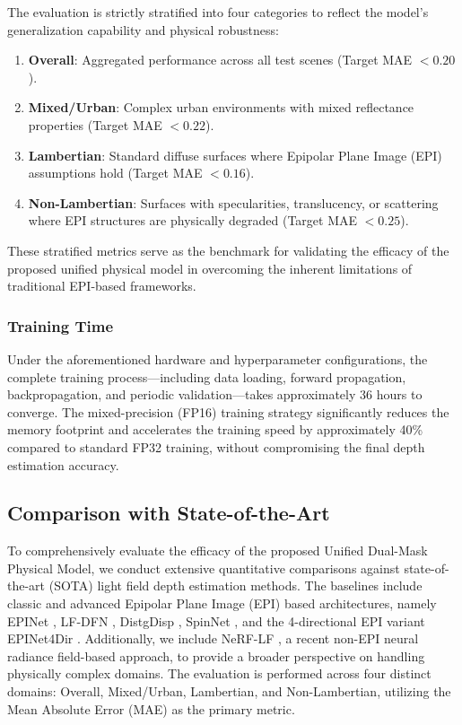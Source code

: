 \documentclass[lettersize,journal]{IEEEtran}
\begin{document}
The evaluation is strictly stratified into four categories to reflect the model's generalization capability and physical robustness: 
\begin{enumerate}
\item \textbf{Overall}: Aggregated performance across all test scenes (Target MAE $< 0.20$).
\item \textbf{Mixed/Urban}: Complex urban environments with mixed reflectance properties (Target MAE $< 0.22$).
\item \textbf{Lambertian}: Standard diffuse surfaces where Epipolar Plane Image (EPI) assumptions hold (Target MAE $< 0.16$).
\item \textbf{Non-Lambertian}: Surfaces with specularities, translucency, or scattering where EPI structures are physically degraded (Target MAE $< 0.25$).
\end{enumerate}

These stratified metrics serve as the benchmark for validating the efficacy of the proposed unified physical model in overcoming the inherent limitations of traditional EPI-based frameworks.

\subsubsection{Training Time}
Under the aforementioned hardware and hyperparameter configurations, the complete training process---including data loading, forward propagation, backpropagation, and periodic validation---takes approximately 36 hours to converge. The mixed-precision (FP16) training strategy significantly reduces the memory footprint and accelerates the training speed by approximately 40\% compared to standard FP32 training, without compromising the final depth estimation accuracy.

\subsection{Comparison with State-of-the-Art}

To comprehensively evaluate the efficacy of the proposed Unified Dual-Mask Physical Model, we conduct extensive quantitative comparisons against state-of-the-art (SOTA) light field depth estimation methods. The baselines include classic and advanced Epipolar Plane Image (EPI) based architectures, namely EPINet \cite{shin2018epinet}, LF-DFN \cite{liang2019lfdfn}, DistgDisp \cite{wang2020distgdisp}, SpinNet \cite{cheng2021spinnet}, and the 4-directional EPI variant EPINet4Dir \cite{epinet4dir2022}. Additionally, we include NeRF-LF \cite{nerflf2023}, a recent non-EPI neural radiance field-based approach, to provide a broader perspective on handling physically complex domains. The evaluation is performed across four distinct domains: Overall, Mixed/Urban, Lambertian, and Non-Lambertian, utilizing the Mean Absolute Error (MAE) as the primary metric. 
\end{document}
